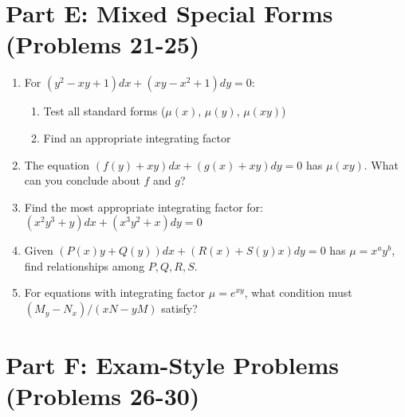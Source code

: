 \documentclass[12pt]{article}
\begin{document}
\section*{Part E: Mixed Special Forms (Problems 21-25)}

\begin{enumerate}[start=21]
\item For $(y^2 - xy + 1)dx + (xy - x^2 + 1)dy = 0$:
\begin{enumerate}[label=(\alph*)]
    \item Test all standard forms ($\mu(x)$, $\mu(y)$, $\mu(xy)$)
    \item Find an appropriate integrating factor
\end{enumerate}

\item The equation $(f(y) + xy)dx + (g(x) + xy)dy = 0$ has $\mu(xy)$. What can you conclude about $f$ and $g$?

\item Find the most appropriate integrating factor for:
$(x^2y^3 + y)dx + (x^3y^2 + x)dy = 0$

\item Given $(P(x)y + Q(y))dx + (R(x) + S(y)x)dy = 0$ has $\mu = x^a y^b$, find relationships among $P, Q, R, S$.

\item For equations with integrating factor $\mu = e^{xy}$, what condition must $(M_y - N_x)/(xN - yM)$ satisfy?
\end{enumerate}

\section*{Part F: Exam-Style Problems (Problems 26-30)}
\end{document}
